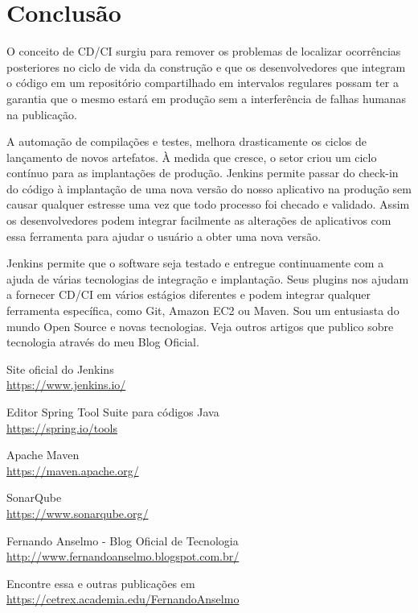 \documentclass[a4paper,11pt]{article}
\begin{document}
\section{Conclusão}
O conceito de CD/CI surgiu para remover os problemas de localizar ocorrências posteriores no ciclo de vida da construção e que os desenvolvedores que integram o código em um repositório compartilhado em intervalos regulares possam ter a garantia que o mesmo estará em produção sem a interferência de falhas humanas na publicação. 

A automação de compilações e testes, melhora drasticamente os ciclos de lançamento de novos artefatos. À medida que cresce, o setor criou um ciclo contínuo para as implantações de produção. Jenkins permite passar do check-in do código à implantação de uma nova versão do nosso aplicativo na produção sem causar qualquer estresse uma vez que todo processo foi checado e validado. Assim os desenvolvedores podem integrar facilmente as alterações de aplicativos com essa ferramenta para ajudar o usuário a obter uma nova versão. 

Jenkins permite que o software seja testado e entregue continuamente com a ajuda de várias tecnologias de integração e implantação. Seus plugins nos ajudam a fornecer CD/CI em vários estágios diferentes e podem integrar qualquer ferramenta específica, como Git, Amazon EC2 ou Maven. Sou um entusiasta do mundo Open Source e novas tecnologias. Veja outros artigos que publico sobre tecnologia através do meu Blog Oficial\cite{fernandoanselmo}.


\begin{thebibliography}{6}
	
  Site oficial do Jenkins \\
  \url{https://www.jenkins.io/}

  Editor Spring Tool Suite para códigos Java \\
  \url{https://spring.io/tools}
  
  Apache Maven \\
  \url{https://maven.apache.org/}

  SonarQube \\
  \url{https://www.sonarqube.org/}

  Fernando Anselmo - Blog Oficial de Tecnologia \\
  \url{http://www.fernandoanselmo.blogspot.com.br/}

  Encontre essa e outras publicações em \\
  \url{https://cetrex.academia.edu/FernandoAnselmo}	
  
\end{thebibliography}
\end{document}
